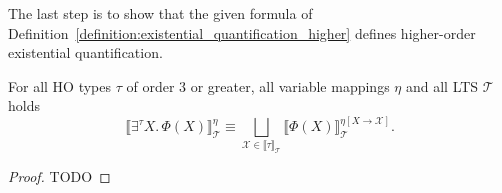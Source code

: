 The last step is to show that the given formula of Definition~\ref{definition:existential_quantification_higher} defines
higher-order existential quantification.

\begin{lemma}
    \label{lemma:existential_quantifier_higher}
    For all HO types $\tau$ of order $3$ or greater, all variable mappings $\eta$ and all LTS $\mathcal{T}$ holds
    \[\llbracket \exists^\tau X.\,\Phi(X)\rrbracket^\eta_\mathcal{T} \equiv \underset{\mathcal{X} \in \llbracket \tau
    \rrbracket_\mathcal{T}}{\bigsqcup} \llbracket \Phi(X) \rrbracket^{\eta[X\rightarrow \mathcal{X}]}_\mathcal{T}.\]
\end{lemma}

\begin{proof}
    TODO
\end{proof}